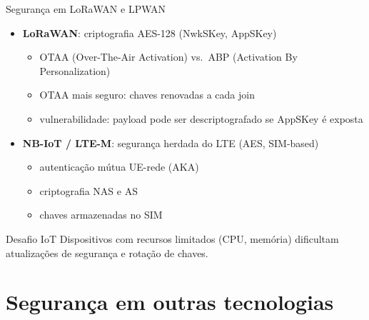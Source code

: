 \documentclass[aspectratio=169,11pt]{beamer}
\begin{document}
\begin{frame}{Segurança em LoRaWAN e LPWAN}
  \begin{itemize}
    \item \textbf{LoRaWAN}: criptografia AES-128 (NwkSKey, AppSKey)
      \begin{itemize}
        \item OTAA (Over-The-Air Activation) vs.\ ABP (Activation By Personalization)
        \item OTAA mais seguro: chaves renovadas a cada join
        \item vulnerabilidade: payload pode ser descriptografado se AppSKey é exposta
      \end{itemize}
    \item \textbf{NB-IoT / LTE-M}: segurança herdada do LTE (AES, SIM-based)
      \begin{itemize}
        \item autenticação mútua UE-rede (AKA)
        \item criptografia NAS e AS
        \item chaves armazenadas no SIM
      \end{itemize}
  \end{itemize}
  \begin{alertblock}{Desafio IoT}
    Dispositivos com recursos limitados (CPU, memória) dificultam atualizações de segurança e rotação de chaves.
  \end{alertblock}
\end{frame}

\section{Segurança em outras tecnologias}
\end{document}
